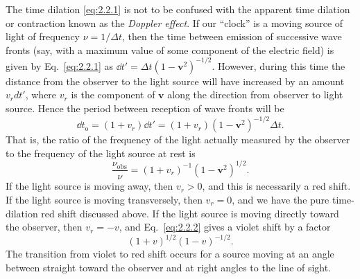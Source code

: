 The time dilation \eqref{eq:2.2.1} is not to be confused with the apparent time
dilation or contraction known as the \emph{Doppler effect}. If our ``clock'' is
a moving source of light of frequency \(\nu=1/\Delta t\), then the time between
emission of successive wave fronts (say, with a maximum value of some component
of the electric field) is given by Eq.~\eqref{eq:2.2.1} as
\(\dd t'=\Delta t(1-\mathbf v^2)^{-1/2}\). However, during this time the
distance from the observer to the light source will have increased by an amount
\(v_rdt'\), where \(v_r\) is the component of \(\mathbf v\) along the
direction from observer to light source. Hence the period between reception of
wave fronts will be
\[
  \dd t_{\mathrm o}=(1+v_r)\dd t'
  =(1+v_r)(1-\mathbf v^2)^{-1/2}\Delta t .
\]
That is, the ratio of the frequency of the light actually measured by the
observer to the frequency of the light source at rest is
\begin{equation}
  \frac{\nu_{\mathrm{obs}}}{\nu}
  =(1+v_r)^{-1}(1-\mathbf v^2)^{1/2}.
  \tag{2.2.2}\label{eq:2.2.2}
\end{equation}
If the light source is moving away, then \(v_r>0\), and this is necessarily a
red shift. If the light source is moving transversely, then \(v_r=0\), and we
have the pure time-dilation red shift discussed above. If the light source is
moving directly toward the observer, then \(v_r=-v\), and Eq.~\eqref{eq:2.2.2}
gives a violet shift by a factor
\[
  (1+v)^{1/2}(1-v)^{-1/2}.
\]
The transition from violet to red shift occurs for a source moving at an angle
between straight toward the observer and at right angles to the line of sight.
